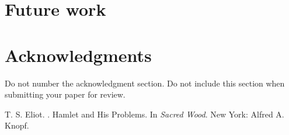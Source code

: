 \documentclass[11pt]{article}
\begin{document}
\section{Future work}





\section*{Acknowledgments}

Do not number the acknowledgment section. Do not include this section when submitting your paper for review.




\begin{thebibliography}{}
T. S. Eliot.
.
\newblock Hamlet and His Problems.
\newblock In {\em Sacred Wood}.
\newblock New York: Alfred A. Knopf.

\end{thebibliography}
\end{document}
